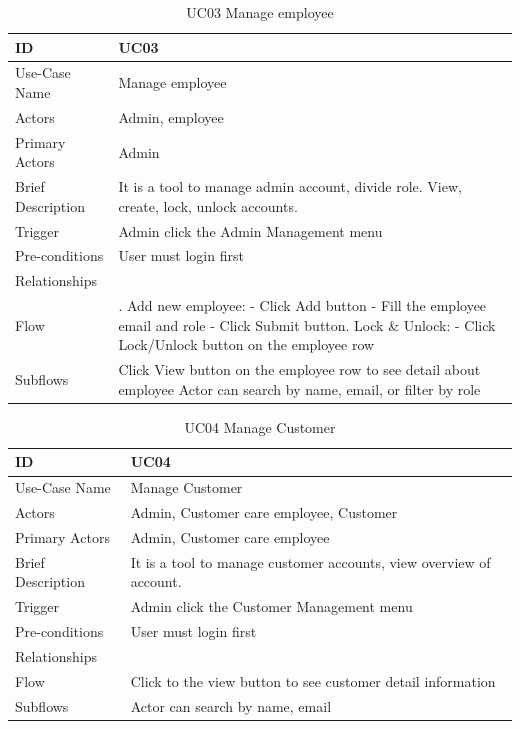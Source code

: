 \begin{table}
\begin{tabular}{|>{\raggedright\arraybackslash}p{5cm}|>{\raggedright\arraybackslash}p{10cm}|}
\hline
ID& UC03 \\
\hline
Use-Case Name& Manage employee\\
\hline
Actors& Admin, employee\\
\hline
Primary Actors& Admin\\
\hline
Brief Description& It is a tool to manage admin account, divide role. View, create, lock, unlock accounts.\\
\hline
Trigger& Admin click the Admin Management menu\\
\hline
Pre-conditions& User must login first \\
\hline
Relationships& \\
\hline
Flow&
1. Add new employee:\break
- Click Add button\break
- Fill the employee email and role\break
- Click Submit button\break
2. Lock \& Unlock:\break
- Click Lock/Unlock button on the employee row\\
\hline
Subflows& Click View button on the employee row to see detail about employee \break
Actor can search by name, email, or filter by role\\
\hline
\end{tabular}
\caption{UC03 Manage employee}
\label{tab:UC03}
\end{table}
\begin{table}
\begin{tabular}{|>{\raggedright\arraybackslash}p{5cm}|>{\raggedright\arraybackslash}p{10cm}|}
\hline
ID& UC04 \\
\hline
Use-Case Name& Manage Customer\\
\hline
Actors& Admin, Customer care employee, Customer\\
\hline
Primary Actors& Admin, Customer care employee\\
\hline
Brief Description& It is a tool to manage customer accounts, view overview of account.\\
\hline
Trigger& Admin click the Customer Management menu\\
\hline
Pre-conditions& User must login first \\
\hline
Relationships& \\
\hline
Flow& Click to the view button to see customer detail information\\
\hline
Subflows&Actor can search by name, email\\
\hline
\end{tabular}
\caption{UC04 Manage Customer}
\label{tab:UC04}
\end{table}

